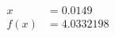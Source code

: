 \documentclass[preview]{standalone}
\begin{document}
\begin{align*}
x &= 0.0149\\f(x) &= 4.0332198
\end{align*}
\end{document}
